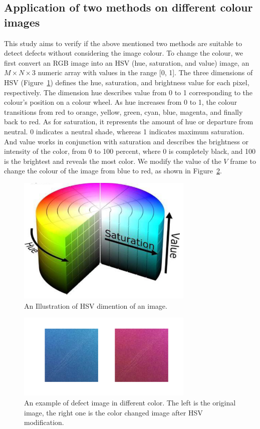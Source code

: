 \subsection{Application of two methods on different colour images}
This study aims to verify if the above mentioned two methods are suitable to detect defects without considering the image colour. To change the colour, we first convert an RGB image into an HSV (hue, saturation, and value) image, an $M\times N \times3$ numeric array with values in the range [0, 1]. The three dimensions of HSV (Figure~\ref{fig:hsv}) defines the hue, saturation, and brightness value for each pixel, respectively. The dimension hue describes value from 0 to 1 corresponding to the colour's position on a colour wheel. As hue increases from 0 to 1, the colour transitions from red to orange, yellow, green, cyan, blue, magenta, and finally back to red. As for saturation, it represents the amount of hue or departure from neutral. 0 indicates a neutral shade, whereas 1 indicates maximum saturation. And value works in conjunction with saturation and describes the brightness or intensity of the color, from 0 to 100 percent, where 0 is completely black, and 100 is the brightest and reveals the most color. We modify the value of the $V$ frame to change the colour of the image from blue to red, as shown in Figure~\ref{fig:color_change}.


\begin{figure}[h]
\centering
\includegraphics[width=0.75\textwidth]{images/hsv.PNG}
\caption{An Illustration of HSV dimention of an image.}
\label{fig:hsv}
\end{figure}

\begin{figure}[h]
\centering
\includegraphics[width=0.75\textwidth]{images/color_change.png}
\caption{An example of defect image in different color. The left is the original image, the right one is the color changed image after HSV modification.}
\label{fig:color_change}
\end{figure}

